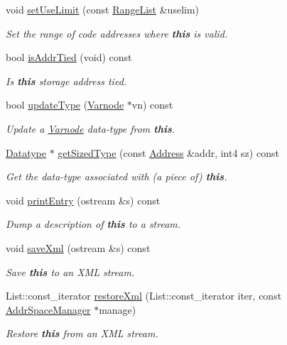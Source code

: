 \begin{DoxyCompactItemize}
void \mbox{\hyperlink{class_symbol_entry_a3ca8de2b7de4adcabc35899d23f9b2e1}{set\+Use\+Limit}} (const \mbox{\hyperlink{class_range_list}{Range\+List}} \&uselim)
\begin{DoxyCompactList}\small\item\em Set the range of code addresses where {\bfseries{this}} is valid. \end{DoxyCompactList}\item 
bool \mbox{\hyperlink{class_symbol_entry_a8e2a7fd30276da3672340e5424aadad9}{is\+Addr\+Tied}} (void) const
\begin{DoxyCompactList}\small\item\em Is {\bfseries{this}} storage address tied. \end{DoxyCompactList}\item 
bool \mbox{\hyperlink{class_symbol_entry_a9a4d4c566e91765896e49a4d565e077e}{update\+Type}} (\mbox{\hyperlink{class_varnode}{Varnode}} $\ast$vn) const
\begin{DoxyCompactList}\small\item\em Update a \mbox{\hyperlink{class_varnode}{Varnode}} data-\/type from {\bfseries{this}}. \end{DoxyCompactList}\item 
\mbox{\hyperlink{class_datatype}{Datatype}} $\ast$ \mbox{\hyperlink{class_symbol_entry_a84cb58373a0e587c0698396a65f3a9b9}{get\+Sized\+Type}} (const \mbox{\hyperlink{class_address}{Address}} \&addr, int4 sz) const
\begin{DoxyCompactList}\small\item\em Get the data-\/type associated with (a piece of) {\bfseries{this}}. \end{DoxyCompactList}\item 
void \mbox{\hyperlink{class_symbol_entry_a0d46ff3d3aef03da78bd7dfd595bd852}{print\+Entry}} (ostream \&s) const
\begin{DoxyCompactList}\small\item\em Dump a description of {\bfseries{this}} to a stream. \end{DoxyCompactList}\item 
void \mbox{\hyperlink{class_symbol_entry_a4d81d9bb16fee6c63a169680073dd28b}{save\+Xml}} (ostream \&s) const
\begin{DoxyCompactList}\small\item\em Save {\bfseries{this}} to an X\+ML stream. \end{DoxyCompactList}\item 
List\+::const\+\_\+iterator \mbox{\hyperlink{class_symbol_entry_a6117b39bc8d1a12e3cba724dab6dff3f}{restore\+Xml}} (List\+::const\+\_\+iterator iter, const \mbox{\hyperlink{class_addr_space_manager}{Addr\+Space\+Manager}} $\ast$manage)
\begin{DoxyCompactList}\small\item\em Restore {\bfseries{this}} from an X\+ML stream. \end{DoxyCompactList}\end{DoxyCompactItemize}
